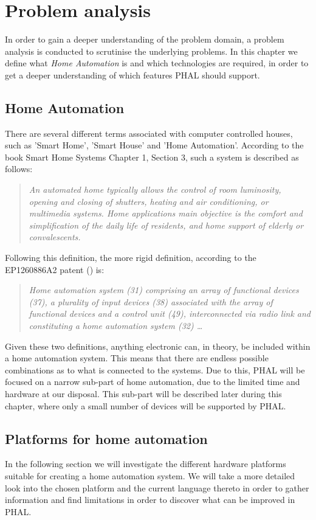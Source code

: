 \chapter{Problem analysis}\label{ch:ProblemAnalysis}
In order to gain a deeper understanding of the problem domain, a problem analysis is conducted to scrutinise the underlying problems. In this chapter we define what \textit{Home Automation} is and which technologies are required, in order to get a deeper understanding of which features PHAL should support.

\section{Home Automation}
There are several different terms associated with computer controlled houses, such as 'Smart Home', 'Smart House' and 'Home Automation'. According to the book Smart Home Systems Chapter 1, Section 3, such a system is described as follows:
\begin{quote}
\textit{An automated home typically allows the control of room  luminosity,  opening  and  closing  of  shutters,  heating and  air  conditioning,  or multimedia systems. Home  applications  main  objective  is  the comfort  and simplification  of  the  daily  life  of residents,  and  home  support  of  elderly or  convalescents.}
\end{quote}
Following this definition, the more rigid definition, according to the EP1260886A2 patent (\cite{EP1206886A2}) is:
\begin{quote}
\textit{Home automation system \textit{(31}) comprising an array of functional devices \textit{(37)}, a plurality of input devices \textit{(38)} associated with the array of functional devices and a control unit \textit{(49)}, interconnected via radio link and constituting a home automation system \textit{(32)} \dots}
\end{quote}
Given these two definitions, anything electronic can, in theory, be included within a home automation system. This means that there are endless possible combinations as to what is connected to the systems. Due to this, PHAL will be focused on a narrow sub-part of home automation, due to the limited time and hardware at our disposal. This sub-part will be described later during this chapter, where only a small number of devices will be supported by PHAL.

\section{Platforms for home automation}
In the following section we will investigate the different hardware platforms suitable for creating a home automation system. We will take a more detailed look into the chosen platform and the current language thereto in order to gather information and find limitations in order to discover what can be improved in PHAL. 

